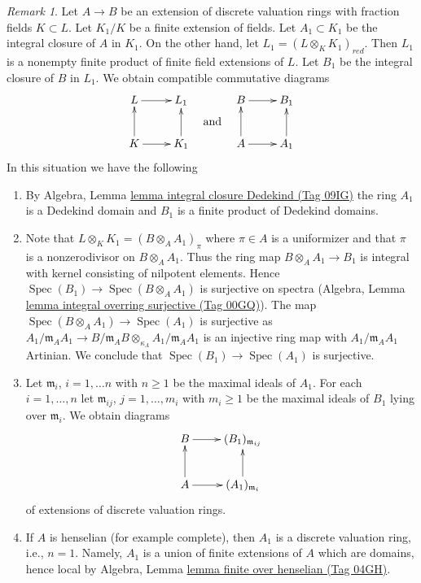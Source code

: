 \documentclass{amsart}
\theoremstyle{plain}
\theoremstyle{definition}
\theoremstyle{remark}
\newtheorem{remark}[subsection]{Remark}
\numberwithin{equation}{subsection}
\def\Spec{\mathop{\mathrm{Spec}}}
\begin{document}
\begin{remark}
\label{remark-construction}
Let $A \to B$ be an extension of discrete valuation rings with fraction
fields $K \subset L$. Let $K_1/K$ be a finite extension of
fields. Let $A_1 \subset K_1$ be the integral closure of $A$ in $K_1$.
On the other hand, let $L_1 = (L \otimes_K K_1)_{red}$. Then $L_1$ is a
nonempty finite product of finite field extensions of $L$. Let $B_1$ be
the integral closure of $B$ in $L_1$. We obtain compatible commutative
diagrams
$$
\vcenter{
\xymatrix{
L \ar[r] & L_1 \\
K \ar[u] \ar[r] & K_1 \ar[u]
}
}
\quad\text{and}\quad
\vcenter{
\xymatrix{
B \ar[r] & B_1 \\
A \ar[u] \ar[r] & A_1 \ar[u]
}
}
$$
In this situation we have the following
\begin{enumerate}
\item By Algebra, Lemma \href{https://stacks.math.columbia.edu/tag/09IG}{lemma integral closure Dedekind (Tag 09IG)}
the ring $A_1$ is a Dedekind domain and $B_1$ is a finite product of
Dedekind domains.
\item Note that $L \otimes_K K_1 = (B \otimes_A A_1)_\pi$ where $\pi \in A$
is a uniformizer and that $\pi$ is a nonzerodivisor on $B \otimes_A A_1$. 
Thus the ring map $B \otimes_A A_1 \to B_1$ is integral with kernel
consisting of nilpotent elements. Hence $\Spec(B_1) \to \Spec(B \otimes_A A_1)$
is surjective on spectra
(Algebra, Lemma \href{https://stacks.math.columbia.edu/tag/00GQ}{lemma integral overring surjective (Tag 00GQ)}).
The map $\Spec(B \otimes_A A_1) \to \Spec(A_1)$ is surjective as
$A_1/\mathfrak m_A A_1 \to
B/\mathfrak m_AB \otimes_{\kappa_A} A_1/\mathfrak m_A A_1$
is an injective ring map with $A_1/\mathfrak m_A A_1$ Artinian.
We conclude that $\Spec(B_1) \to \Spec(A_1)$ is surjective.
\item Let $\mathfrak m_i$, $i = 1, \ldots n$ with $n \geq 1$ be the
maximal ideals of $A_1$. For each $i = 1, \ldots, n$ let
$\mathfrak m_{ij}$, $j = 1, \ldots, m_i$ with $m_i \geq 1$
be the maximal ideals of $B_1$ lying over $\mathfrak m_i$. We obtain diagrams
$$
\xymatrix{
B \ar[r] & (B_1)_{\mathfrak m_{ij}} \\
A \ar[u] \ar[r] & (A_1)_{\mathfrak m_i} \ar[u]
}
$$
of extensions of discrete valuation rings.
\item If $A$ is henselian (for example complete), then $A_1$ is a
discrete valuation ring, i.e., $n = 1$.
Namely, $A_1$ is a union of finite extensions of $A$ which are domains,
hence local by Algebra, Lemma \href{https://stacks.math.columbia.edu/tag/04GH}{lemma finite over henselian (Tag 04GH)}.

\end{enumerate}
\end{remark}
\end{document}
